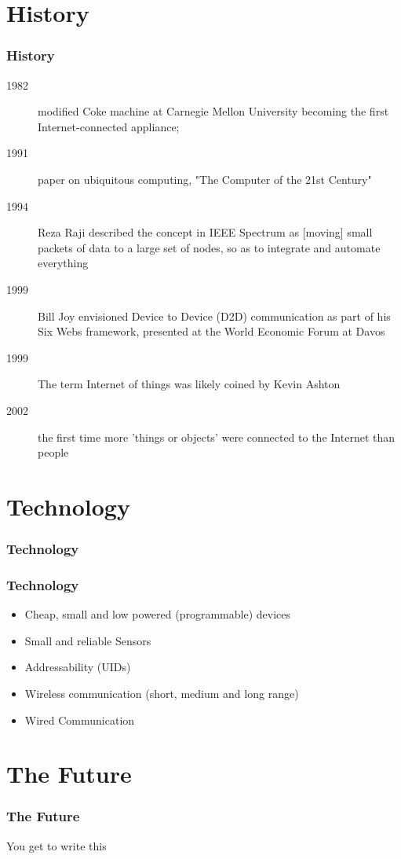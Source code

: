 \documentclass{beamer}
\begin{document}
  \section{History}
  \begin{frame}
  	\frametitle{History}
\begin{description}
	\item[1982] modified Coke machine at Carnegie Mellon University becoming the first Internet-connected appliance;
	\item[1991] paper on ubiquitous computing, "The Computer of the 21st Century"
	\item[1994] Reza Raji described the concept in IEEE Spectrum as [moving] small packets of data to a large set of nodes, so as to integrate and automate everything
	\item[1999] Bill Joy envisioned Device to Device (D2D) communication as part of his Six Webs framework, presented at the World Economic Forum at Davos
	\item[1999] The term Internet of things was likely coined by Kevin Ashton 
	\item[2002] the first time more 'things or objects' were connected to the Internet than people
\end{description}

  \end{frame}
  
   \section{Technology}
   \begin{frame}
   	\frametitle{Technology}

   \end{frame}
     \begin{frame}
     	\frametitle{Technology}
     	\begin{itemize}
     		\item Cheap, small and low powered (programmable) devices
     		\item Small and reliable Sensors
     		\item Addressability (UIDs)
     		\item Wireless communication (short, medium and long range)
     		\item Wired Communication
     	\end{itemize}
     \end{frame} 
    \section{The Future}
    \begin{frame}
    	\frametitle{The Future}
     You get to write this
    \end{frame}
    
\end{document}
